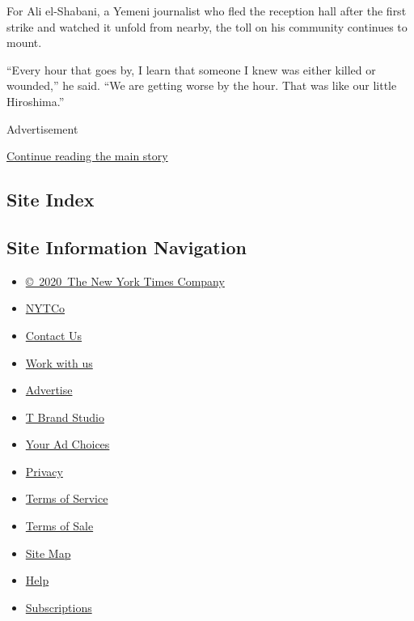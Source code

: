 For Ali el-Shabani, a Yemeni journalist who fled the reception hall
after the first strike and watched it unfold from nearby, the toll on
his community continues to mount.

``Every hour that goes by, I learn that someone I knew was either killed
or wounded,'' he said. ``We are getting worse by the hour. That was like
our little Hiroshima.''

Advertisement

\protect\hyperlink{after-bottom}{Continue reading the main story}

\hypertarget{site-index}{%
\subsection{Site Index}\label{site-index}}

\hypertarget{site-information-navigation}{%
\subsection{Site Information
Navigation}\label{site-information-navigation}}

\begin{itemize}
\tightlist
\item
  \href{https://help.nytimes3xbfgragh.onion/hc/en-us/articles/115014792127-Copyright-notice}{©~2020~The
  New York Times Company}
\end{itemize}

\begin{itemize}
\tightlist
\item
  \href{https://www.nytco.com/}{NYTCo}
\item
  \href{https://help.nytimes3xbfgragh.onion/hc/en-us/articles/115015385887-Contact-Us}{Contact
  Us}
\item
  \href{https://www.nytco.com/careers/}{Work with us}
\item
  \href{https://nytmediakit.com/}{Advertise}
\item
  \href{http://www.tbrandstudio.com/}{T Brand Studio}
\item
  \href{https://www.nytimes3xbfgragh.onion/privacy/cookie-policy\#how-do-i-manage-trackers}{Your
  Ad Choices}
\item
  \href{https://www.nytimes3xbfgragh.onion/privacy}{Privacy}
\item
  \href{https://help.nytimes3xbfgragh.onion/hc/en-us/articles/115014893428-Terms-of-service}{Terms
  of Service}
\item
  \href{https://help.nytimes3xbfgragh.onion/hc/en-us/articles/115014893968-Terms-of-sale}{Terms
  of Sale}
\item
  \href{https://spiderbites.nytimes3xbfgragh.onion}{Site Map}
\item
  \href{https://help.nytimes3xbfgragh.onion/hc/en-us}{Help}
\item
  \href{https://www.nytimes3xbfgragh.onion/subscription?campaignId=37WXW}{Subscriptions}
\end{itemize}
